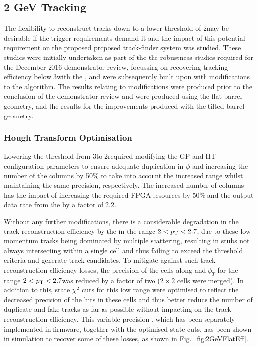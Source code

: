 \subsection{2 GeV Tracking}\label{subsec:Tmtt2GeV}
The flexibility to reconstruct tracks down to a lower \pT threshold of 2\GeV may be desirable if the trigger requirements demand it and the impact of this potential requirement on the proposed proposed track-finder system was studied.
These studies were initially undertaken as part of the the robustness studies required for the December 2016 demonstrator review, focussing on recovering tracking efficiency below 3\GeV with the \HT, and were subsequently built upon with modifications to the \KF algorithm. 
The results relating to \HT modifications were produced prior to the conclusion of the demonstrator review and were produced using the flat barrel geometry, and the results for the \KF improvements produced with the tilted barrel geometry.

\subsubsection{Hough Transform Optimisation}
Lowering the \HT \pT threshold from 3\GeV to 2\GeV required modifying the GP and HT configuration parameters to ensure adequate duplication in $\phi$ and increasing the number of the \qpt columns by 50\% to take into account the increased \pt range whilst maintaining the same precision, respectively.
The increased number of \qpt columns has the impact of increasing the required FPGA resources by 50\% and the output data rate from the \HT by a factor of 2.2.

Without any further modifications, there is a considerable degradation in the track reconstruction efficiency by the \HT in the range $2 < p_{\mathrm{T}} < 2.7$\GeVc, due to these low momentum tracks being dominated by multiple scattering, resulting in stubs not always intersecting within a single \HT cell and thus failing to exceed the threshold criteria and generate track candidates.
To mitigate against such track reconstruction efficiency losses, the precision of the \HT cells along \qpt and $\phi_{T}$ for the range $2 < p_{\mathrm{T}} < 2.7$\GeVc was reduced by a factor of two (\ie $2 \times 2$ cells were merged).
In addition to this, \KF state $\chi^2$ cuts for this low \pT range were optimised to reflect the decreased precision of the hits in these \HT cells and thus better reduce the number of duplicate and fake tracks as far as possible without impacting on the \HT track reconstruction efficiency.
This variable precision \HT, which has been separately implemented in firmware, together with the optimised \KF state cuts, has been shown in simulation to recover some of these losses, as shown in Fig.~\ref{fig:2GeVFlatEff}.

